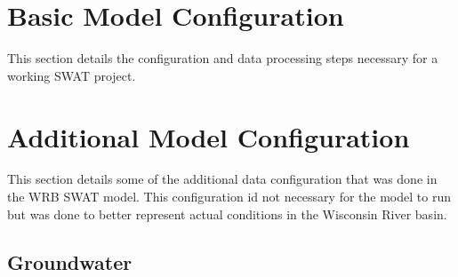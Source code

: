 	
\pagebreak
\section{Basic Model Configuration}\label{sec:basic_model_config}
	This section details the configuration and data processing steps necessary for a working SWAT project.
	
	
	
	
	
	
	
	
\pagebreak


%		
	
\pagebreak
\section{Additional Model Configuration}
	This section details some of the additional data configuration that was done in the WRB SWAT model. This configuration id not necessary for the model to run but was done to better represent actual conditions in the Wisconsin River basin.
	
	
	
	
	
	
\subsection{Groundwater}
	
	
	
	
\pagebreak